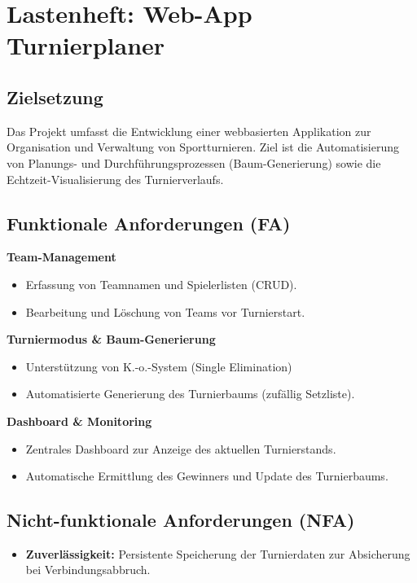 \section{Lastenheft: Web-App Turnierplaner}

\subsection{Zielsetzung}
Das Projekt umfasst die Entwicklung einer webbasierten Applikation zur Organisation und Verwaltung von Sportturnieren. Ziel ist die Automatisierung von Planungs- und Durchführungsprozessen (Baum-Generierung) sowie die Echtzeit-Visualisierung des Turnierverlaufs.

\subsection{Funktionale Anforderungen (FA)}

\textbf{Team-Management}
\begin{itemize}
    \item Erfassung von Teamnamen und Spielerlisten (CRUD).
    \item Bearbeitung und Löschung von Teams vor Turnierstart.
\end{itemize}

\textbf{Turniermodus \& Baum-Generierung}
\begin{itemize}
    \item Unterstützung von K.-o.-System (Single Elimination)
    \item Automatisierte Generierung des Turnierbaums (zufällig Setzliste).
\end{itemize}

\textbf{Dashboard \& Monitoring}
\begin{itemize}
    \item Zentrales Dashboard zur Anzeige des aktuellen Turnierstands.
    \item Automatische Ermittlung des Gewinners und Update des Turnierbaums.
\end{itemize}

\subsection{Nicht-funktionale Anforderungen (NFA)}
\begin{itemize}
    \item \textbf{Zuverlässigkeit:} Persistente Speicherung der Turnierdaten zur Absicherung bei Verbindungsabbruch.
\end{itemize}


